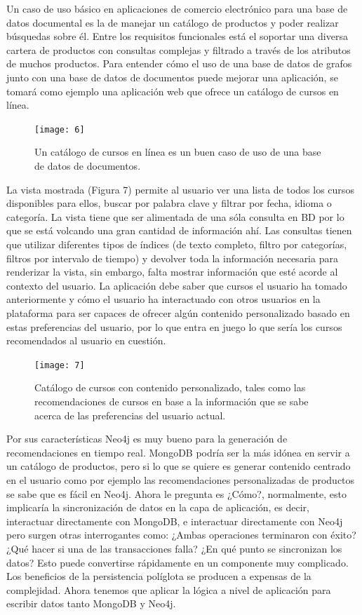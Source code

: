 \documentclass[conference]{IEEEtran}
\begin{document}
Un caso de uso b\'asico en aplicaciones de comercio electr\'onico para una base de datos documental es la de manejar un cat\'alogo de productos y poder realizar b\'usquedas sobre \'el. Entre los requisitos funcionales está el soportar una diversa cartera de productos con consultas complejas y filtrado a trav\'es de los atributos de muchos productos. Para entender c\'omo el uso de una base de datos de grafos  junto con una base de datos de documentos puede mejorar una aplicaci\'on, se tomar\'a como ejemplo una aplicaci\'on web que ofrece un cat\'alogo de cursos en l\'inea.

\begin{figure}[!h]
\centering
\texttt{[image: 6]}
\caption{Un cat\'alogo de cursos en l\'inea es un buen caso de uso de una base de datos de documentos.}
\label{fig6}
\end{figure}

La vista mostrada (Figura 7) permite al usuario ver una lista de todos los cursos disponibles para ellos, buscar por palabra clave y filtrar por fecha, idioma o categor\'ia. La vista tiene que ser alimentada de una s\'ola consulta en BD por lo que se est\'a volcando una gran cantidad de informaci\'on ah\'i. Las consultas tienen que utilizar diferentes tipos de \'indices (de texto completo, filtro por categor\'ias, filtros por intervalo de tiempo) y devolver toda la informaci\'on necesaria para renderizar la vista, sin embargo, falta mostrar informaci\'on que est\'e acorde al contexto del usuario. La aplicaci\'on debe saber que cursos el usuario ha tomado anteriormente y c\'omo el usuario ha interactuado con otros usuarios en la plataforma para ser capaces de ofrecer alg\'un contenido personalizado basado en estas preferencias del usuario, por lo que entra en juego lo que ser\'ia los cursos recomendados al usuario en cuesti\'on.

\begin{figure}[!h]
\centering
\texttt{[image: 7]}
\caption{Cat\'alogo de cursos con contenido personalizado, tales como las recomendaciones de cursos en base a la informaci\'on que se sabe acerca de las preferencias del usuario actual.}
\label{fig7}
\end{figure}

Por sus caracter\'isticas Neo4j es muy bueno para la generaci\'on de recomendaciones en tiempo real. MongoDB podr\'ia ser la m\'as id\'onea en servir a un cat\'alogo de productos, pero si lo que se quiere es generar contenido centrado en el usuario como por ejemplo las recomendaciones personalizadas de productos se sabe que es f\'acil en Neo4j. Ahora le pregunta es ¿C\'omo?, normalmente, esto implicar\'ia la sincronizaci\'on de datos en la capa de aplicaci\'on, es decir, interactuar directamente con  MongoDB, e interactuar directamente con Neo4j pero surgen otras interrogantes como: ¿Ambas operaciones terminaron con \'exito? ¿Qu\'e hacer si una de las transacciones falla? ¿En qu\'e punto se sincronizan los datos? Esto puede convertirse r\'apidamente en un componente muy complicado. Los beneficios de la persistencia pol\'iglota se producen a expensas de la complejidad. Ahora tenemos que aplicar la l\'ogica a nivel de aplicaci\'on para escribir datos tanto MongoDB y Neo4j.
\end{document}
